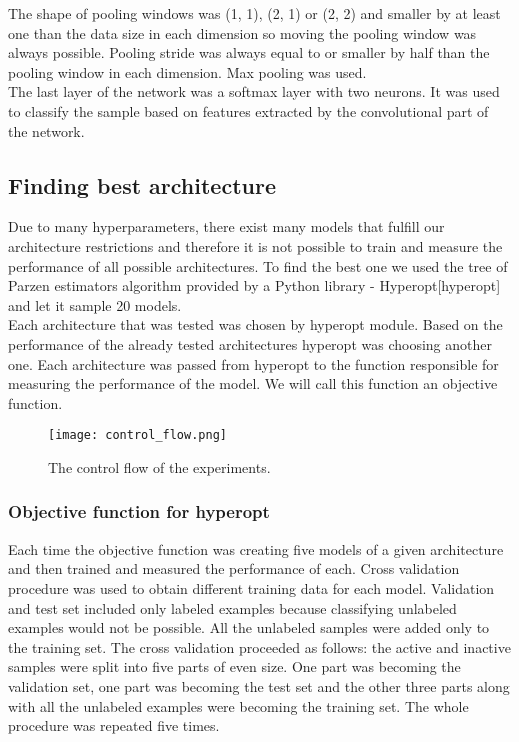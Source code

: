 \documentclass[a4paper,10pt]{report}
\begin{document}
      The shape of pooling windows was (1, 1), (2, 1) or (2, 2) and smaller by at least one than the data size in each dimension so moving the pooling window was always possible. Pooling stride was always equal to or smaller by half than the pooling window in each dimension. Max pooling was used.\\
      
      The last layer of the network was a softmax layer with two neurons. It was used to classify the sample based on features extracted by the convolutional part of the network.\\
      
	\subsection{Finding best architecture}
	Due to many hyperparameters, there exist many models that fulfill our architecture restrictions and therefore it is not possible to train and measure the performance of all possible architectures. To find the best one we used the tree of Parzen estimators algorithm provided by a Python library - Hyperopt[hyperopt] and let it sample 20 models.\\
	
	Each architecture that was tested was chosen by hyperopt module. Based on the performance of the already tested architectures hyperopt was choosing another one. Each architecture was passed from hyperopt to the function responsible for measuring the performance of the model. We will call this function an objective function.\\
	
	 \begin{figure}[h!]
	  \centering
	  \texttt{[image: control\_flow.png]}
	  \caption{The control flow of the experiments.}
	  \label{fig:control_flow}
	\end{figure} 
	
	\subsubsection{Objective function for hyperopt}
	Each time the objective function was creating five models of a given architecture and then trained and measured the performance of each. Cross validation procedure was used to obtain different training data for each model. Validation and test set included only labeled examples because classifying unlabeled examples would not be possible. All the unlabeled samples were added only to the training set. The cross validation proceeded as follows: the active and inactive samples were split into five parts of even size. One part was becoming the validation set, one part was becoming the test set and the other three parts along with all the unlabeled examples were becoming the training set. The whole procedure was repeated five times.\\
	
\end{document}
